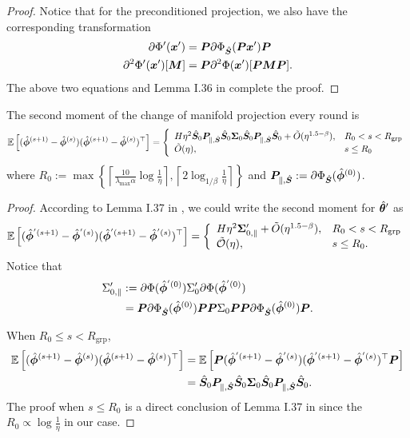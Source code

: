 \begin{proof}
    Notice that for the preconditioned projection, we also have the corresponding transformation
    \begin{align*}
        \partial \Phi'({\bm{x}}') &= {\bm{P}} \partial \Phi_{\hat{{\bm{S}}}}({\bm{P}} {\bm{x}}') {\bm{P}}\\
         \partial^2 \Phi'({\bm{x}}') [{\bm{M}}] &= {\bm{P}} \partial^2 \Phi({\bm{x}}')[{\bm{P}} {\bm{M}} {\bm{P}}].
    \end{align*}
    The above two equations and Lemma I.36 in \citet{gu2023andwhendoeslocal} complete the proof.
\end{proof}
\begin{lemma}\label{lma:2nd-moment}
The second moment of the change of manifold projection every round is
\[
\mathbb{E}\left[ (\hat{{\bm{\phi}}}^{(s+1)} - \hat{{\bm{\phi}}}^{(s)})(\hat{{\bm{\phi}}}^{(s+1)} - \hat{{\bm{\phi}}}^{(s)})^{\top} \right] = \left\{
\begin{array}{ll}
H \eta^2 \hat{{\bm{S}}}_0 {\bm{P}}_{\parallel,\hat{{\bm{S}}}} \hat{{\bm{S}}}_0 {\bm{\Sigma}}_{0}\hat{{\bm{S}}}_0{\bm{P}}_{\parallel,\hat{{\bm{S}}}}\hat{{\bm{S}}}_0 + \tilde{O}(\eta^{1.5-\beta}), & R_0 < s < R_{\mathrm{grp}} \\
\tilde{O}(\eta), & s \leq R_0
\end{array}
\right.
\]
where \( R_0 := \max\left\{\left\lceil \frac{10}{\lambda_{\max} \alpha} \log \frac{1}{\eta} \right\rceil, \left\lceil 2\log_{1/\beta} \frac{1}{\eta} \right\rceil \right\} \) and ${\bm{P}}_{\parallel,\hat{{\bm{S}}}}:=\partial \Phi_{\hat{{\bm{S}}}}(\hat{{\bm{\phi}}}^{(0)})$.
\end{lemma}
\begin{proof}
    According to Lemma I.37 in \citet{gu2023andwhendoeslocal}, we could write the second moment for $\hat{{\bm{\theta}}}'$ as
\[
\mathbb{E}\left[ (\hat{{\bm{\phi}}}^{'(s+1)} - \hat{{\bm{\phi}}}^{'(s)})(\hat{{\bm{\phi}}}^{'(s+1)} - \hat{{\bm{\phi}}}^{'(s)})^{\top} \right] = \left\{
\begin{array}{ll}
H \eta^2 {\bm{\Sigma}}_{0,\parallel}'+ \tilde{O}(\eta^{1.5-\beta}), & R_0 < s < R_{\mathrm{grp}} \\
\tilde{\mathcal{O}}(\eta), & s \leq R_0.
\end{array}
\right.
\]
Notice that
\begin{align*}
    \Sigma_{0,\parallel}' &:= \partial \Phi(\hat{{\bm{\phi}}}^{'(0)}) \Sigma_{0}'\partial \Phi(\hat{{\bm{\phi}}}^{'(0)})\\
    &= {\bm{P}}\partial \Phi_{\hat{{\bm{S}}}}(\hat{{\bm{\phi}}}^{(0)}){\bm{P}}  {\bm{P}}\Sigma_{0} {\bm{P}} {\bm{P}}\partial \Phi_{\hat{{\bm{S}}}}(\hat{{\bm{\phi}}}^{(0)}) {\bm{P}}.
\end{align*}

When $R_0 \le s < R_{\mathrm{grp}}$,
\begin{align*}
    \mathbb{E}\left[ (\hat{{\bm{\phi}}}^{(s+1)} - \hat{{\bm{\phi}}}^{(s)})(\hat{{\bm{\phi}}}^{(s+1)} - \hat{{\bm{\phi}}}^{(s)})^{\top} \right] &= \mathbb{E}\left[ {\bm{P}}(\hat{{\bm{\phi}}}^{'(s+1)} - \hat{{\bm{\phi}}}^{'(s)})(\hat{{\bm{\phi}}}^{'(s+1)} - \hat{{\bm{\phi}}}^{'(s)})^{\top} {\bm{P}}\right]\\
    &= \hat{{\bm{S}}}_0 {\bm{P}}_{\parallel,\hat{{\bm{S}}}} \hat{{\bm{S}}}_0 {\bm{\Sigma}}_{0}\hat{{\bm{S}}}_0{\bm{P}}_{\parallel,\hat{{\bm{S}}}}\hat{{\bm{S}}}_0.
\end{align*}
The proof when $s \le R_0$ is a direct conclusion of Lemma I.37 in \citet{gu2023andwhendoeslocal} since the $R_0 \propto \log \frac{1}{\eta}$ in our case.
\end{proof}

